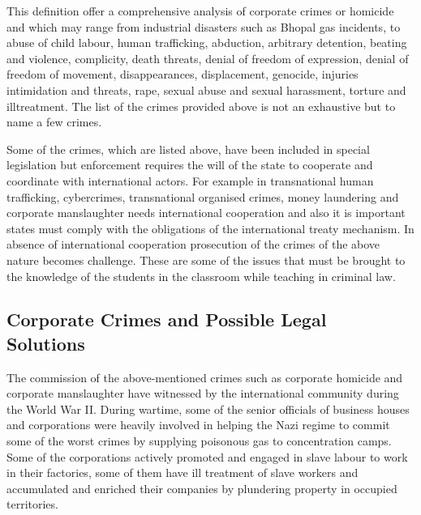 \begin{multicols}{2}
\vspace{-.5cm}

\noi
This definition offer a comprehensive analysis of corporate crimes or homicide and
which may range from industrial disasters such as Bhopal gas incidents, to abuse
of child labour, human trafficking, abduction, arbitrary detention, beating and
violence, complicity, death threats, denial of freedom of expression, denial of
freedom of movement, disappearances, displacement, genocide, injuries
intimidation and threats, rape, sexual abuse and sexual harassment, torture and illtreatment. The list of the crimes provided above is not an exhaustive but to name a
few crimes.


\noi
Some of the crimes, which are listed above, have been included in special
legislation but enforcement requires the will of the state to cooperate and
coordinate with international actors. For example in transnational human
trafficking, cybercrimes, transnational organised crimes, money laundering and
corporate manslaughter needs international cooperation and also it is important
states must comply with the obligations of the international treaty mechanism. In
absence of international cooperation prosecution of the crimes of the above nature
becomes challenge. These are some of the issues that must be brought to the
knowledge of the students in the classroom while teaching in criminal law.

\vspace{-.15cm}

\subsection{Corporate Crimes and Possible Legal\\ Solutions}\label{subsection-3.2}

\vspace{-.1cm}

\noi
The commission of the above-mentioned crimes such as corporate homicide and
corporate manslaughter have witnessed by the international community during the
World War II. During wartime, some of the senior officials of business houses and
corporations were heavily involved in helping the Nazi regime to commit some of
the worst crimes by supplying poisonous gas to concentration camps. Some of the
corporations actively promoted and engaged in slave labour to work in their
factories, some of them have ill treatment of slave workers and accumulated and
enriched their companies by plundering property in occupied territories.


\end{multicols}
